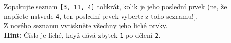 \question[50]
Zopakujte seznam \texttt{[3, 11, 4]} tolikrát, kolik je jeho poslední prvek (ne,
že napíšete natvrdo \texttt{4}, ten poslední prvek vyberte z toho seznamu!).\\
Z nového seznamu vytiskněte všechny jeho liché prvky.\\
\textbf{Hint:} Číslo je liché, když dává zbytek \texttt{1} po dělení \texttt{2}.